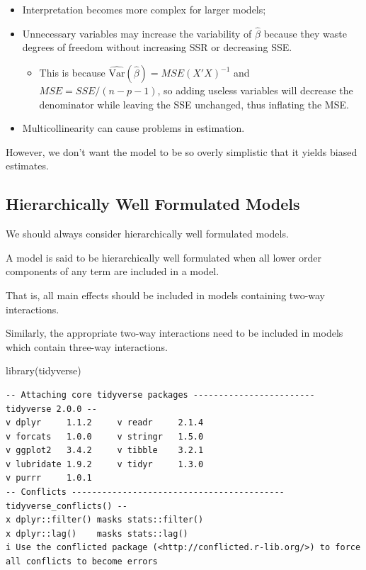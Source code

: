 \documentclass[
  letterpaper,
  DIV=11,
  numbers=noendperiod]{scrreport}
\newenvironment{Shaded}{\begin{snugshade}}{\end{snugshade}}
\newcommand{\FunctionTok}[1]{\textcolor[rgb]{0.28,0.35,0.67}{#1}}
\newcommand{\NormalTok}[1]{\textcolor[rgb]{0.00,0.23,0.31}{#1}}
\providecommand{\tightlist}{%
  \setlength{\itemsep}{0pt}\setlength{\parskip}{0pt}}\usepackage{longtable,booktabs,array}
\begin{document}
\begin{itemize}
\tightlist
\item
  Interpretation becomes more complex for larger models;
\item
  Unnecessary variables may increase the variability of \(\hat \beta\)
  because they waste degrees of freedom without increasing SSR or
  decreasing SSE.

  \begin{itemize}
  \tightlist
  \item
    This is because \(\widehat{\text{Var}}(\hat \beta) = MSE(X'X)^{-1}\)
    and \(MSE = SSE/(n-p-1)\), so adding useless variables will decrease
    the denominator while leaving the SSE unchanged, thus inflating the
    MSE.
  \end{itemize}
\item
  Multicollinearity can cause problems in estimation.
\end{itemize}

However, we don't want the model to be so overly simplistic that it
yields biased estimates.

\hypertarget{hierarchically-well-formulated-models}{%
\subsection{Hierarchically Well Formulated
Models}\label{hierarchically-well-formulated-models}}

We should always consider {hierarchically well formulated models}.

A model is said to be hierarchically well formulated when all lower
order components of any term are included in a model.

That is, all main effects should be included in models containing
two-way interactions.

Similarly, the appropriate two-way interactions need to be included in
models which contain three-way interactions.

\begin{Shaded}
\begin{Highlighting}[]
\FunctionTok{library}\NormalTok{(tidyverse)}
\end{Highlighting}
\end{Shaded}

\begin{verbatim}
-- Attaching core tidyverse packages ------------------------ tidyverse 2.0.0 --
v dplyr     1.1.2     v readr     2.1.4
v forcats   1.0.0     v stringr   1.5.0
v ggplot2   3.4.2     v tibble    3.2.1
v lubridate 1.9.2     v tidyr     1.3.0
v purrr     1.0.1     
-- Conflicts ------------------------------------------ tidyverse_conflicts() --
x dplyr::filter() masks stats::filter()
x dplyr::lag()    masks stats::lag()
i Use the conflicted package (<http://conflicted.r-lib.org/>) to force all conflicts to become errors
\end{verbatim}
\end{document}
